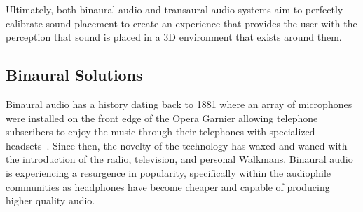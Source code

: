 Ultimately, both binaural audio and transaural audio systems aim  to perfectly
calibrate sound placement to create an experience that provides the user with
the perception that sound is placed in a 3D environment that exists around them.



\subsection{                 Binaural Solutions                               }

Binaural audio has a history dating back to 1881 where an array of microphones
were installed on the front edge of the Opera Garnier allowing telephone
subscribers to enjoy the music through their telephones with specialized
headsets~\cite{jost2000transaural}.  Since then, the novelty of the technology
has waxed and waned with the introduction of the radio, television, and personal
Walkmans.  Binaural audio is experiencing a resurgence in popularity,
specifically within the audiophile communities as headphones have become
cheaper and capable of producing higher quality audio.


